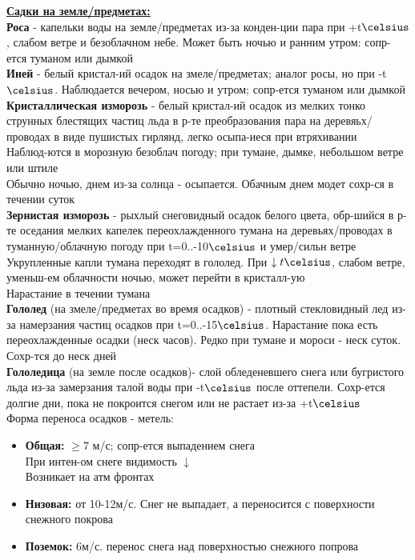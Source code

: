 \underline{\textbf{Садки на земле/предметах:}}\\
\textbf{Роса} - капельки воды на земле/предметах из-за конден-ции пара при +t$\celsius$, слабом ветре и безоблачном небе. Может быть ночью и ранним утром: сопр-ется туманом или дымкой\\

\textbf{Иней} - белый кристал-ий осадок на змеле/предметах; аналог росы, но при -t$\celsius$. Наблюдается вечером, носью и утром; сопр-ется туманом или дымкой\\

\textbf{Кристаллическая изморозь} - белый кристал-ий осадок из мелких тонко струнных блестящих частиц льда в р-те преобразования пара на деревяьх/проводах в виде пушистых гирлянд, легко осыпа-иеся при втряхивании\\
Наблюд-ются в морозную безоблач погоду; при тумане, дымке, небольшом ветре или штиле\\
Обычно ночью, днем из-за солнца - осыпается. Обачным днем модет сохр-ся в течении суток\\

\textbf{Зернистая изморозь} - рыхлый снеговидный осадок белого цвета, обр-шийся в р-те оседания мелких капелек переохлажденного тумана на деревьях/проводах в туманную/облачную погоду при t=0..-10$\celsius$ и умер/сильн ветре\\
Укрупленные капли тумана переходят в гололед. При $\downarrow t\celsius$, слабом ветре, уменьш-ем облачности ночью, может перейти в кристалл-ую\\
Нарастание в течении тумана\\

\textbf{Гололед} (на змеле/предметах во время осадков) - плотный стекловидный лед из-за намерзания частиц осадков при t=0..-15$\celsius$. Нарастание пока есть переохлажденные осадки (неск часов). Редко при тумане и мороси - неск суток. Сохр-тся до неск дней\\

\textbf{Гололедица} (на земле после осадков)- слой обледеневшего снега или бугристого льда из-за замерзания талой воды при -t$\celsius$ после оттепели. Сохр-ется долгие дни, пока не покроится снегом или не растает из-за +t$\celsius$\\

Форма переноса осадков - метель:
\begin{itemize}
	\item \textbf{Общая:} $\geqslant 7$ м/с; сопр-ется выпадением снега\\
		При интен-ом снеге видимость $\downarrow$\\
		Возникает на атм фронтах
	\item \textbf{Низовая:} от 10-12м/с. Снег не выпадает, а переносится с поверхности снежного покрова
	\item \textbf{Поземок:} 6м/с. перенос снега над поверхностью снежного попрова
\end{itemize}

